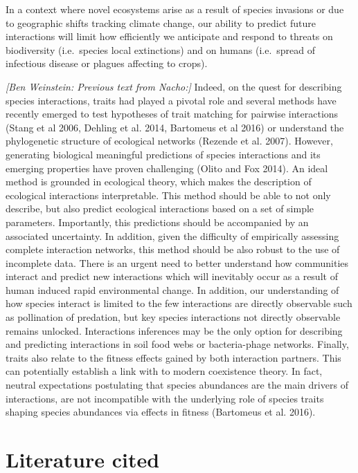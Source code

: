 In a context where novel ecosystems arise as a result of species invasions or
due to geographic shifts tracking climate change, our ability to predict future
interactions will limit how efficiently we anticipate and respond to threats on
biodiversity (i.e.~species local extinctions) and on humans (i.e.~spread of
infectious disease or plagues affecting to crops).

\emph{{[}Ben Weinstein: Previous text from Nacho:{]}} Indeed, on the quest for
describing species interactions, traits had played a pivotal role and several
methods have recently emerged to test hypotheses of trait matching for pairwise
interactions (Stang et al 2006, Dehling et al. 2014, Bartomeus et al 2016) or
understand the phylogenetic structure of ecological networks (Rezende et al.
2007). However, generating biological meaningful predictions of species
interactions and its emerging properties have proven challenging (Olito and Fox
2014). An ideal method is grounded in ecological theory, which makes the
description of ecological interactions interpretable. This method should be able
to not only describe, but also predict ecological interactions based on a set of
simple parameters. Importantly, this predictions should be accompanied by an
associated uncertainty. In addition, given the difficulty of empirically
assessing complete interaction networks, this method should be also robust to
the use of incomplete data. There is an urgent need to better understand how
communities interact and predict new interactions which will inevitably occur as
a result of human induced rapid environmental change. In addition, our
understanding of how species interact is limited to the few interactions are
directly observable such as pollination of predation, but key species
interactions not directly observable remains unlocked. Interactions inferences
may be the only option for describing and predicting interactions in soil food
webs or bacteria-phage networks. Finally, traits also relate to the fitness
effects gained by both interaction partners. This can potentially establish a
link with to modern coexistence theory. In fact, neutral expectations
postulating that species abundances are the main drivers of interactions, are
not incompatible with the underlying role of species traits shaping species
abundances via effects in fitness (Bartomeus et al. 2016).

\section{Literature cited}\label{literature-cited}

